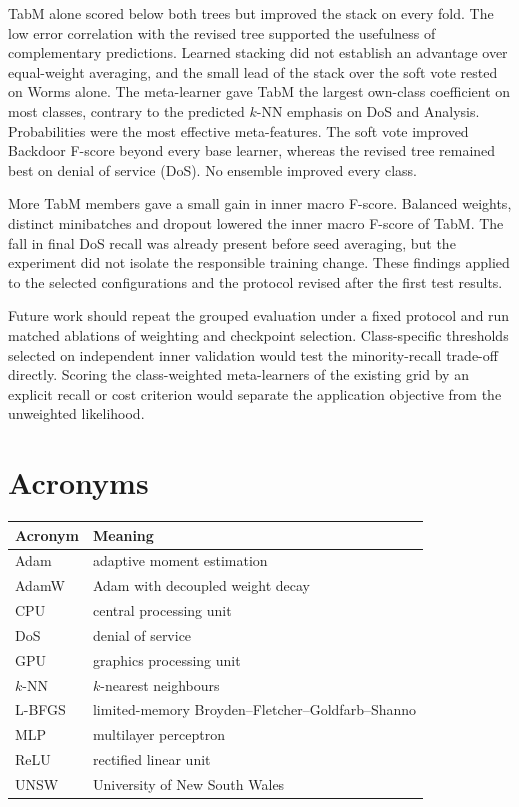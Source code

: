 \documentclass[conference]{IEEEtran}
\newcommand{\knn}{\mbox{$k$-NN}}
\begin{document}
TabM alone scored below both trees but improved the stack on every fold. The low error correlation with the revised tree supported the usefulness of complementary predictions. Learned stacking did not establish an advantage over equal-weight averaging, and the small lead of the stack over the soft vote rested on Worms alone. The meta-learner gave TabM the largest own-class coefficient on most classes, contrary to the predicted \knn{} emphasis on DoS and Analysis. Probabilities were the most effective meta-features. The soft vote improved Backdoor F-score beyond every base learner, whereas the revised tree remained best on denial of service (DoS). No ensemble improved every class.

More TabM members gave a small gain in inner macro F-score. Balanced weights, distinct minibatches and dropout lowered the inner macro F-score of TabM. The fall in final DoS recall was already present before seed averaging, but the experiment did not isolate the responsible training change. These findings applied to the selected configurations and the protocol revised after the first test results.

Future work should repeat the grouped evaluation under a fixed protocol and run matched ablations of weighting and checkpoint selection. Class-specific thresholds selected on independent inner validation would test the minority-recall trade-off directly. Scoring the class-weighted meta-learners of the existing grid by an explicit recall or cost criterion would separate the application objective from the unweighted likelihood.

\appendices
\section{Acronyms}
\footnotesize
\begin{tabular}{@{}l>{\raggedright\arraybackslash}p{6.2cm}@{}}
    \toprule
    Acronym & Meaning                                                \\
    \midrule
    Adam    & adaptive moment estimation                             \\
    AdamW   & Adam with decoupled weight decay                       \\
    CPU     & central processing unit                                \\
    DoS     & denial of service                                      \\
    GPU     & graphics processing unit                               \\
    \knn    & $k$-nearest neighbours                                 \\
    L-BFGS  & limited-memory Broyden--Fletcher--Goldfarb--Shanno     \\
    MLP     & multilayer perceptron                                  \\
    ReLU    & rectified linear unit                                  \\
    UNSW    & University of New South Wales                          \\
    \bottomrule
\end{tabular}
\end{document}
